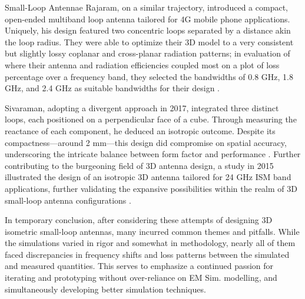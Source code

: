 \documentclass[12pt]{article}
\begin{document}
\begin{section} {Small-Loop Antennae}
Rajaram, on a similar trajectory, introduced a compact, open-ended multiband loop antenna tailored for 4G mobile phone applications. Uniquely, his design featured two concentric loops separated by a distance akin the loop radius. They were able to optimize their 3D model to a very consistent but slightly lossy coplanar and cross-planar radiation patterns; in evaluation of where their antenna and radiation efficiencies coupled most on a plot of loss percentage over a frequency band, they selected the bandwidths of 0.8 GHz, 1.8 GHz, and 2.4 GHz as suitable bandwidths for their design \cite{rajaram_compact_2015}.

Sivaraman, adopting a divergent approach in 2017, integrated three distinct loops, each positioned on a perpendicular face of a cube. Through measuring the reactance of each component, he deduced an isotropic outcome. Despite its compactness—around 2 mm—this design did compromise on spatial accuracy, underscoring the intricate balance between form factor and performance \cite{sivaraman_three_2017}. Further contributing to the burgeoning field of 3D antenna design, a study in 2015 illustrated the design of an isotropic 3D antenna tailored for 24 GHz ISM band applications, further validating the expansive possibilities within the realm of 3D small-loop antenna configurations \cite{sravani_design_2015}.

In temporary conclusion, after considering these attempts of designing 3D isometric small-loop antennas, many incurred common themes and pitfalls. While the simulations varied in rigor and somewhat in methodology, nearly all of them faced discrepancies in frequency shifts and loss patterns between the simulated and measured quantities. This serves to emphasize a continued passion for iterating and prototyping without over-reliance on EM Sim. modelling, and simultaneously developing better simulation techniques.

\end{section}
\end{document}
